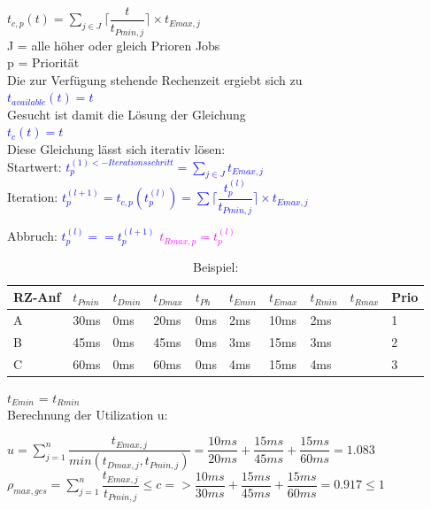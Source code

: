 \documentclass[12pt,a4paper,oneside,ngerman]{article}
\begin{document}
\( t_{c,p}(t) = \displaystyle\sum_{j \in J} \Big\lceil \dfrac{t}{ t_{Pmin,j} } \Big\rceil \times t_{Emax,j} \)\\
J = alle höher oder gleich Prioren Jobs\\
p = Priorität\\

Die zur Verfügung stehende Rechenzeit ergiebt sich zu \\
\textcolor{blue}{\( t_{available}(t) = t \)}\\
Gesucht ist damit die Lösung der Gleichung\\
\textcolor{blue}{\( t_c(t) = t \)}\\
Diese Gleichung lässt sich iterativ lösen:\\
Startwert: \textcolor{blue}{ \(t_{p}^{(1)<-Iterationsschritt} = \displaystyle\sum_{j \in J} t_{Emax,j} \)}\\

Iteration: \textcolor{blue}{ \( t_{p}^{(l+1)} = t_{c,p}(t_{p}^{(l)}) = \displaystyle\sum \Big\lceil \dfrac{t_{p}^{(l)}}{ t_{Pmin,j} } \Big\rceil \times t_{Emax,j} \) }

Abbruch: \textcolor{blue}{ \( t_{p}^{(l)} == t_{p}^{(l+1)} \) }  \textcolor{magenta}{ \( t_{Rmax,p} = t_{p}^{(l)} \) }

\pagebreak
\begin{table}[H]
	\caption{Beispiel:}
	\begin{tabular}{|l|l|l|l|l|l|l|l|l|l|}
	\hline
	RZ-Anf & \(t_{Pmin}\) & \(t_{Dmin}\) & \(t_{Dmax}\) & \(t_{Ph}\) & \(t_{Emin}\) & \(t_{Emax}\) & \(t_{Rmin}\) & \(t_{Rmax}\) & Prio \\ \hline
	A      & 30ms         & 0ms          & 20ms         & 0ms        & 2ms          & 10ms         & 2ms          &              & 1    \\ \hline
	B      & 45ms         & 0ms          & 45ms         & 0ms        & 3ms          & 15ms         & 3ms          &              & 2    \\ \hline
	C      & 60ms         & 0ms          & 60ms         & 0ms        & 4ms          & 15ms         & 4ms          &              & 3    \\ \hline
	\end{tabular}
\end{table}

\(t_{Emin}\) = \(t_{Rmin}\)\\

Berechnung der Utilization u:

\(u = \displaystyle\sum_{j=1}^n \dfrac{t_{Emax,j}}{ min(t_{Dmax,j}, t_{Pmin,j})}  =  \dfrac{10ms}{20ms} + \dfrac{15ms}{45ms} + \dfrac{15ms}{60ms} = 1.083 \)\\
\(\rho_{max,ges} = \displaystyle\sum_{j=1}^n \dfrac{t_{Emax,j}}{t_{Pmin,j}} \leq c => \dfrac{10ms}{30ms} + \dfrac{15ms}{45ms} + \dfrac{15ms}{60ms} = 0.917 \leq 1\)\\
\end{document}
